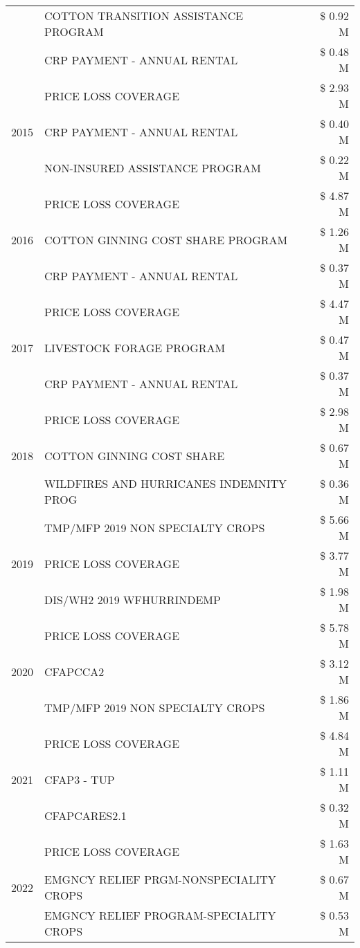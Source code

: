 \begin{tabular}{llr}
 & COTTON TRANSITION ASSISTANCE PROGRAM & \$ 0.92 M \\
 & CRP PAYMENT - ANNUAL RENTAL & \$ 0.48 M \\
\cline{1-3}
\multirow[t]{3}{*}{2015} & PRICE LOSS COVERAGE & \$ 2.93 M \\
 & CRP PAYMENT - ANNUAL RENTAL & \$ 0.40 M \\
 & NON-INSURED ASSISTANCE PROGRAM & \$ 0.22 M \\
\cline{1-3}
\multirow[t]{3}{*}{2016} & PRICE LOSS COVERAGE & \$ 4.87 M \\
 & COTTON GINNING COST SHARE PROGRAM & \$ 1.26 M \\
 & CRP PAYMENT - ANNUAL RENTAL & \$ 0.37 M \\
\cline{1-3}
\multirow[t]{3}{*}{2017} & PRICE LOSS COVERAGE & \$ 4.47 M \\
 & LIVESTOCK FORAGE PROGRAM & \$ 0.47 M \\
 & CRP PAYMENT - ANNUAL RENTAL & \$ 0.37 M \\
\cline{1-3}
\multirow[t]{3}{*}{2018} & PRICE LOSS COVERAGE & \$ 2.98 M \\
 & COTTON GINNING COST SHARE & \$ 0.67 M \\
 & WILDFIRES AND HURRICANES INDEMNITY PROG & \$ 0.36 M \\
\cline{1-3}
\multirow[t]{3}{*}{2019} & TMP/MFP 2019 NON SPECIALTY CROPS & \$ 5.66 M \\
 & PRICE LOSS COVERAGE & \$ 3.77 M \\
 & DIS/WH2 2019 WFHURRINDEMP & \$ 1.98 M \\
\cline{1-3}
\multirow[t]{3}{*}{2020} & PRICE LOSS COVERAGE & \$ 5.78 M \\
 & CFAPCCA2 & \$ 3.12 M \\
 & TMP/MFP 2019 NON SPECIALTY CROPS & \$ 1.86 M \\
\cline{1-3}
\multirow[t]{3}{*}{2021} & PRICE LOSS COVERAGE & \$ 4.84 M \\
 & CFAP3 - TUP & \$ 1.11 M \\
 & CFAPCARES2.1 & \$ 0.32 M \\
\cline{1-3}
\multirow[t]{3}{*}{2022} & PRICE LOSS COVERAGE & \$ 1.63 M \\
 & EMGNCY RELIEF PRGM-NONSPECIALITY CROPS & \$ 0.67 M \\
 & EMGNCY RELIEF PROGRAM-SPECIALITY CROPS & \$ 0.53 M \\
\cline{1-3}
\bottomrule
\end{tabular}
